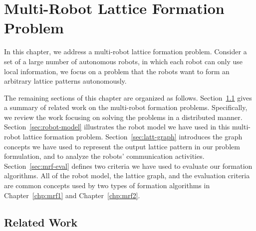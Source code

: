 \chapter{Multi-Robot Lattice Formation Problem}
\label{chp:mrf}

In this chapter, we address a multi-robot lattice formation problem.
%
Consider a set of a large number of autonomous robots, in which each
robot can only use local information, 
we focus on a problem that the robots want to form an arbitrary lattice patterns autonomously.


The remaining sections of this chapter are organized as follows. 
%
Section~\ref{sec:related-mrf} gives a summary of related work on the multi-robot formation problems.
%
Specifically, we review the work focusing on solving the problems in a distributed manner. 
%
Section~\ref{sec:robot-model} illustrates the robot model we have used in this multi-robot lattice formation problem.
%
Section~\ref{sec:latt-graph} introduces the graph concepts we have used to represent the output lattice pattern in our problem formulation, and to analyze the robots' communication activities. 
%
Section~\ref{sec:mrf-eval} defines two criteria we have used to evaluate our formation algorithms.
%
All of the robot model, the lattice graph, and the evaluation criteria are common concepts used by two types of formation algorithms in Chapter~\ref{chp:mrf1} and Chapter~\ref{chp:mrf2}.

\section{Related Work}
\label{sec:related-mrf}


